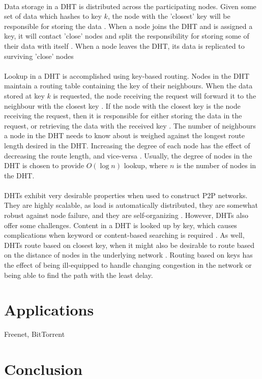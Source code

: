 \documentclass[12pt,letterpaper]{article}
\begin{document}
\paragraph{}

Data storage in a DHT is distributed across the participating nodes.
Given some set of data which hashes to key $k$, the node with the 'closest' key will be responsible for storing the data \cite{dht-ietf}.
When a node joins the DHT and is assigned a key, it will contact 'close' nodes and split the responsibility for storing some of their data with itself \cite{dht-ietf}.
When a node leaves the DHT, its data is replicated to surviving 'close' nodes \cite{dht-ietf}

\paragraph{}

Lookup in a DHT is accomplished using key-based routing.
Nodes in the DHT maintain a routing table containing the key of their neighbours.
When the data stored at key $k$ is requested, the node receiving the request will forward it to the neighbour with the closest key \cite{dht}.
If the node with the closest key is the node receiving the request, then it is responsible for either storing the data in the request, or retrieving the data with the received key \cite{dht}.
The number of neighbours a node in the DHT needs to know about is weighed against the longest route length desired in the DHT.
Increasing the degree of each node has the effect of decreasing the route length, and vice-versa \cite{wiki-dht}.
Usually, the degree of nodes in the DHT is chosen to provide $O(\log n)$ lookup, where $n$ is the number of nodes in the DHT.

\paragraph{}

DHTs exhibit very desirable properties when used to construct P2P networks.
They are highly scalable, as load is automatically distributed, they are somewhat robust against node failure, and they are self-organizing \cite{dht-ietf}.
However, DHTs also offer some challenges.
Content in a DHT is looked up by key, which causes complications when keyword or content-based searching is required \cite{dht}\cite{dht-ietf}.
As well, DHTs route based on closest key, when it might also be desirable to route based on the distance of nodes in the underlying network \cite{dht}.
Routing based on keys has the effect of being ill-equipped to handle changing congestion in the network or being able to find the path with the least delay.

\section{Applications}

Freenet, BitTorrent

\section{Conclusion}



\end{document}
